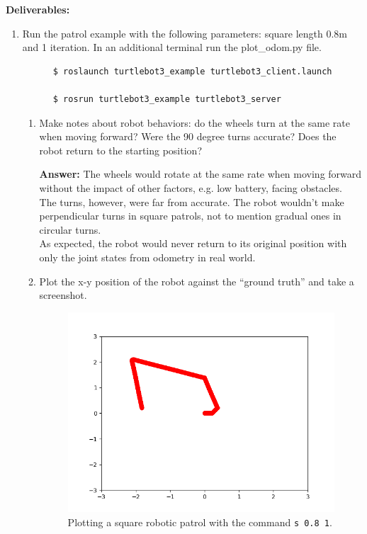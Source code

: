 \documentclass[12pt]{article}
\begin{document}
\textbf{Deliverables:}
\begin{enumerate}
    
    \item Run the patrol example with the following parameters: square length 0.8m and 1 iteration. In an additional terminal run the plot\_odom.py file.
    
    \begin{verbatim}
      $ roslaunch turtlebot3_example turtlebot3_client.launch
      
      $ rosrun turtlebot3_example turtlebot3_server
    \end{verbatim}

    \begin{enumerate}

        \item Make notes about robot behaviors: do the wheels turn at the same rate when moving forward? Were the 90 degree turns accurate? Does the robot return to the starting position?
        
        \textbf{Answer: }The wheels would rotate at the same rate when moving forward without the impact of other factors, e.g. low battery, facing obstacles.
        \\The turns, however, were far from accurate. The robot wouldn't make perpendicular turns in square patrols, not to mention gradual ones in circular turns.
        \\As expected, the robot would never return to its original position with only the joint states from odometry in real world.

        \item Plot the x-y position of the robot against the “ground truth” and take a screenshot.
        
        \begin{figure}[H]
          \centering\includegraphics[width=14cm]{images/gmapping.png}\vspace{-10pt}
          \caption{Plotting a square robotic patrol with the command \texttt{s 0.8 1}.}\label{fig:gmapping}
          \end{figure}


\end{enumerate}
\end{enumerate}
\end{document}
